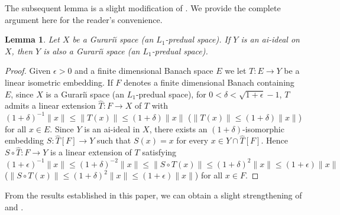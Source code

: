 \documentclass[11pt]{amsart}
\newtheorem{lemma}[thm]{Lemma}
\theoremstyle{definition}
\theoremstyle{remark}
\begin{document}
The subsequent lemma is a slight modification of \cite[Proposition 2.5]{Ban18}. We provide the complete argument here for the reader's convenience.

\begin{lemma}\label{lem:inheritGurarii}
Let $X$ be a Gurari\u{\i} space (an $L_1$-predual space). If $Y$ is an ai-ideal on $X$, then
$Y$ is also a Gurari\u{\i} space (an $L_1$-predual space).
\end{lemma}
\begin{proof}
Given $\epsilon > 0$ and a finite dimensional Banach space $E$ we let $T:E\to Y$ be a linear isometric embedding. If $F$ denotes a finite dimensional Banach containing $E$, since $X$ is a Gurari\u{\i} space (an $L_1$-predual space), for $0<\delta<\sqrt{1+\epsilon}-1$, $T$ admits a linear extension $\hat{T}: F\to X$ of $T$ with $(1+\delta)^{-1}\|x\| \leq \|T(x)\|\leq (1 + \delta)\|x\|$ ($\|T(x)\|\leq (1 + \delta)\|x\|$) for all $x\in E$. Since $Y$ is an ai-ideal in $X$, there exists an $(1+\delta)$-isomorphic embedding $S:\hat{T}[F] \to Y$ such that $S(x)=x$ for every $x\in Y\cap \hat{T}[F]$. Hence $S\circ \hat{T}: F \to Y$ is a linear extension of $T$ satisfying $(1 + \epsilon)^{-1}\|x\|\leq (1 + \delta)^{-2}\|x\|\leq \|S\circ T(x)\| \leq (1 + \delta)^2\|x\|\leq (1 + \epsilon)\|x\|$ ($\|S\circ T(x)\| \leq (1 + \delta)^2\|x\|\leq (1 + \epsilon)\|x\|$) for all $x\in F$. 
\end{proof}

From the results established in this paper, we can obtain a slight strengthening of \cite[Theorem 3.4]{GarbuKubis} and \cite[Theorem 2.6 and Theorem 2.8]{Ban18}.
\end{document}

